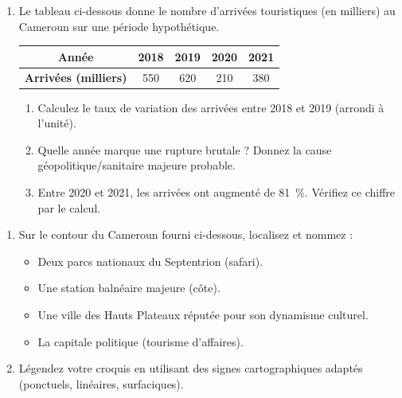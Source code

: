 \documentclass[11pt]{article}
\begin{document}
\begin{exercice}
\begin{enumerate}
    \item Le tableau ci-dessous donne le nombre d'arrivées touristiques (en milliers) au Cameroun sur une période hypothétique.
    \begin{center}
    \begin{tabular}{|c|c|c|c|c|}
    \hline
    \textbf{Année} & 2018 & 2019 & 2020 & 2021 \\ \hline
    \textbf{Arrivées (milliers)} & 550 & 620 & 210 & 380 \\ \hline
    \end{tabular}
    \end{center}
    \begin{enumerate}
        \item Calculez le taux de variation des arrivées entre 2018 et 2019 (arrondi à l'unité).
        \item Quelle année marque une rupture brutale ? Donnez la cause géopolitique/sanitaire majeure probable.
        \item Entre 2020 et 2021, les arrivées ont augmenté de \SI{81}{\percent}. Vérifiez ce chiffre par le calcul.
    \end{enumerate}
\end{enumerate}
\end{exercice}

\begin{exercice}
\begin{enumerate}
    \item Sur le contour du Cameroun fourni ci-dessous, localisez et nommez :
    \begin{itemize}
        \item Deux parcs nationaux du Septentrion (safari).
        \item Une station balnéaire majeure (côte).
        \item Une ville des Hauts Plateaux réputée pour son dynamisme culturel.
        \item La capitale politique (tourisme d'affaires).
    \end{itemize}
    \item Légendez votre croquis en utilisant des signes cartographiques adaptés (ponctuels, linéaires, surfaciques).
\end{enumerate}
\begin{center}
\end{center}
\end{exercice}
\end{document}
